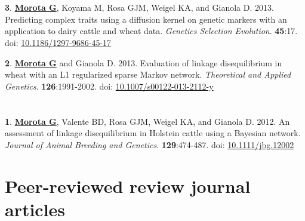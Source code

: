 \documentclass[margin,line,10pt]{res}
\newenvironment{list1}{
  \begin{list}{\ding{113}}{%
      \setlength{\itemsep}{0in}
      \setlength{\parsep}{0in} \setlength{\parskip}{0in}
      \setlength{\topsep}{0in} \setlength{\partopsep}{0in} 
      \setlength{\leftmargin}{0.17in}}}{\end{list}}
\begin{document}
\begin{resume}
\section{}


\begin{list1}
\item [{\bf 3}.]  {\bf \underline{Morota G}}, Koyama M, Rosa GJM, Weigel KA, and Gianola D. 2013.
     Predicting complex traits using a diffusion kernel on genetic markers with an application to dairy cattle and wheat data. \emph{Genetics Selection Evolution}. {\bf 45}:17. doi: \textcolor{blue}{\href{http://dx.doi.org/10.1186/1297-9686-45-17}{10.1186/1297-9686-45-17}}

\vspace{0.5cm}

\item [{\bf 2}.] {\bf \underline{Morota G}} and Gianola D. 2013.  Evaluation of linkage disequilibrium in wheat with an L1 regularized sparse Markov network.
  \emph{Theoretical and Applied Genetics}. {\bf 126}:1991-2002. doi: \textcolor{blue}{\href{http://dx.doi.org/10.1007/s00122-013-2112-y}{10.1007/s00122-013-2112-y}}
\end{list1}


\section{}
\begin{list1} 
\item [{\bf 1}.] {\bf \underline{Morota G}}, Valente BD, Rosa GJM, Weigel KA, and Gianola D. 2012.  
An assessment of linkage disequilibrium in Holstein cattle using a Bayesian network. \emph{Journal of Animal Breeding and Genetics}. {\bf 129}:474-487. doi: \textcolor{blue}{\href{http://dx.doi.org/10.1111/jbg.12002}{10.1111/jbg.12002}}
\end{list1}





\section{\sc Peer-reviewed review journal articles}

\vspace{1.5cm}




 

\section{}
\begin{list1}


\end{list1}
\end{resume}
\end{document}
